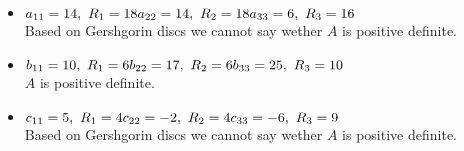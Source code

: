{\color{solution}
\begin{itemize}
	\item $a_{11}=14,~R_1=18\\a_{22}=14,~R_2=18\\a_{33}=6,~R_3=16$\\Based on Gershgorin discs we cannot say wether $A$ is positive definite.
	\item $b_{11}=10,~R_1=6\\b_{22}=17,~R_2=6\\b_{33}=25,~R_3=10$\\$A$ is positive definite.
	\item $c_{11}=5,~R_1=4\\c_{22}=-2,~R_2=4\\c_{33}=-6,~R_3=9$\\Based on Gershgorin discs we cannot say wether $A$ is positive definite.
\end{itemize}
}